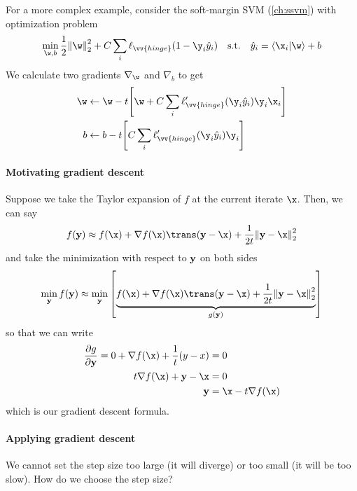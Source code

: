 \documentclass[class=cs480,notes,tikz]{agony}
\begin{document}
For a more complex example, consider the soft-margin SVM (\cref{ch:ssvm})
with optimization problem
\[
  \min_{\w,b} \frac12\norm{\w}^2_2 + C\sum_i \ell_{\vv{hinge}}(1-\y_i\hat y_i)
  \qq{s.t.} \hat y_i = \ip{\x_i}{\w}+b
\]
We calculate two gradients $\nabla_{\w}$ and $\nabla_b$ to get
\begin{align*}
  \w & \gets \w - t\qty[\w + C\sum_i \ell'_{\vv{hinge}}(\y_i\hat y_i)\y_i\x_i] \\
  b  & \gets b - t\qty[C\sum_i \ell'_{\vv{hinge}}(\y_i\hat y_i)\y_i]
\end{align*}

\paragraph{Motivating gradient descent}
Suppose we take the Taylor expansion of $f$ at the current iterate $\x$.
Then, we can say
\[ f(\vb y) \approx f(\x) + \nabla f(\x)\trans(\vb y-\x) + \frac1{2t}\norm{\vb y-\x}_2^2 \]
and take the minimization with respect to $\vb y$ on both sides
\[
  \min_{\vb y} f(\vb y) \approx
  \min_{\vb y}\qty[\underbrace{f(\x) + \nabla f(\x)\trans(\vb y-\x) + \frac1{2t}\norm{\vb y-\x}_2^2}_{g(\vb y)}]
\]
so that we can write
\begin{align*}
  \pdv{g}{\vb y} = 0 + \nabla f(\x) + \frac1t(y-x) & = 0                  \\
  t\nabla f(\x) + \vb y- \x                        & = 0                  \\
  \vb y                                            & = \x - t\nabla f(\x)
\end{align*}
which is our gradient descent formula.

\paragraph{Applying gradient descent}
We cannot set the step size too large (it will diverge)
or too small (it will be too slow). How do we choose the step size?
\end{document}
